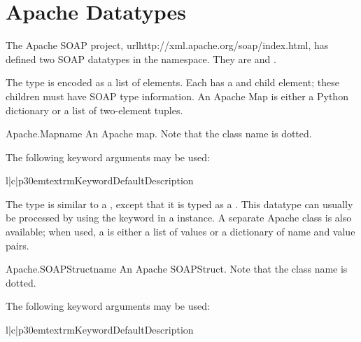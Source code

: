 \section{Apache Datatypes}

The Apache SOAP project, url{http://xml.apache.org/soap/index.html},
has defined two SOAP datatypes in the 
 namespace.
They are  and .

The  type is encoded as a list of  elements.
Each  has a  and  child element; these
children must have SOAP type information.
An Apache Map is either a Python dictionary or a list of two-element
tuples.

\begin{classdesc}{Apache.Map}{name}
An Apache map.
Note that the class name is dotted.
\end{classdesc}

The following keyword arguments may be used:

\begin{tableiii}{l|c|p{30em}}{textrm}{Keyword}{Default}{Description}
\end{tableiii}

The  type is similar to a , except that
it is typed as a .
This datatype can usually be processed by using the  keyword in a
 instance.
A separate Apache  class is also available; when used,
a  is either a list of values or a dictionary of name
and value pairs.

\begin{classdesc}{Apache.SOAPStruct}{name}
An Apache SOAPStruct.
Note that the class name is dotted.
\end{classdesc}

The following keyword arguments may be used:

\begin{tableiii}{l|c|p{30em}}{textrm}{Keyword}{Default}{Description}
\end{tableiii}
